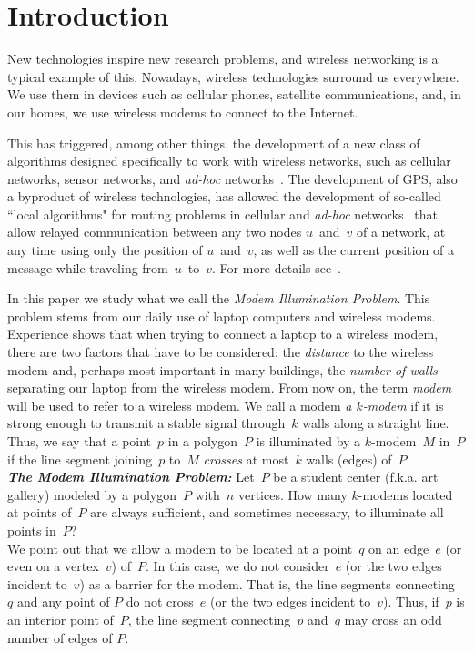 \documentclass[A4]{article}
\begin{document}
\section{Introduction}

New technologies inspire new research problems, and wireless networking is a typical example of this.
Nowadays, wireless technologies surround us everywhere.
We use them in devices such as cellular phones, satellite communications, and, in our homes, we use wireless modems to connect to the Internet.

This has triggered, among other things, the development of a new class of algorithms designed specifically to work with wireless networks, such as cellular networks, sensor networks, and \emph{ad-hoc} networks~\cite{Kran2,Urrutia2,Watten}.
The development of GPS, also a byproduct of wireless technologies, has allowed the development of so-called ``local algorithms" for routing problems in cellular and \emph{ad-hoc} networks~\cite{BMSU,Krana,Urrutia2} that allow relayed communication between any two nodes $u$~and~$v$ of a network, at any time using  only the position of $u$~and~$v$, as well as the current position of a message while traveling from~$u$~to~$v$.
For more details see~\cite{Urrutia2,Watten}.

In this paper we study what we call the \emph{Modem Illumination Problem}.
This problem stems from our daily use of laptop computers and wireless modems.
Experience shows that when trying to connect a laptop to a wireless modem, there are two factors that have to be considered: the \emph{distance} to the wireless modem and, perhaps most important in many buildings, the \emph{number of walls} separating our laptop from the wireless modem.
From now on, the term \emph{modem} will be used to refer to a wireless modem.
We call a modem \emph{a $k$-modem} if it is strong enough to transmit a stable signal through~$k$ walls along a straight line.
Thus, we say that a point~$p$ in a polygon~$P$ is illuminated by a \mbox{$k$-modem}~$M$ in~$P$ if the line segment joining~$p$ to~$M$ \emph{crosses} at most~$k$ walls (edges) of~$P$.\\

\noindent \emph{\bf{The Modem Illumination Problem}: }
Let~$P$ be a student center (f.k.a. art gallery) modeled by a polygon~$P$ with~$n$ vertices.
How many \mbox{$k$-modems} located at points of~$P$ are always sufficient, and sometimes necessary, to illuminate all points in~$P$?\\

We point out that we allow a modem to be located at a point~$q$ on an edge~$e$ (or even on a vertex~$v$) of~$P$.
In this case, we do not consider~$e$ (or the two edges incident to~$v$) as a barrier for the modem.
That is, the line segments connecting~$q$ and any point of $P$ do not cross~$e$ (or the two edges incident to~$v$).
Thus, if~$p$ is an interior point of~$P$, the line segment connecting~$p$ and~$q$ may cross an odd number of edges of $P$.
\end{document}
